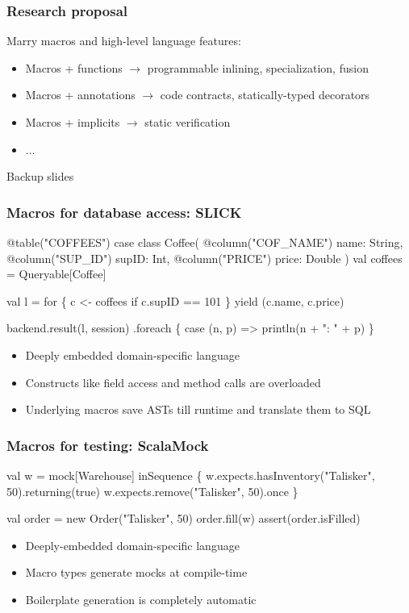 \documentclass[hyperref={bookmarks=false}]{beamer}
\begin{document}
\begin{frame}[fragile]
\frametitle{Research proposal}

Marry macros and high-level language features:

\begin{itemize}
\item Macros + functions $\rightarrow$ programmable inlining, specialization, fusion
\item Macros + annotations $\rightarrow$ code contracts, statically-typed decorators
\item Macros + implicits $\rightarrow$ static verification
\item ...
\end{itemize}
\end{frame}

\begin{frame}[fragile]
\vskip50pt
\begin{center}
\large Backup slides
\end{center}
\end{frame}

\begin{frame}[fragile]
\frametitle{Macros for database access: SLICK}
\begin{semiverbatim}
@table("COFFEES") case class Coffee(
  @column("COF_NAME") name: String,
  @column("SUP_ID") supID: Int,
  @column("PRICE") price: Double
)
val coffees = Queryable[Coffee]

val l = for \{ c <- coffees if c.supID == 101 \}
yield (c.name, c.price)

backend.result(l, session)
 .foreach \{ case (n, p) => println(n + ": " + p) \}
\end{semiverbatim}

\begin{itemize}
\item Deeply embedded domain-specific language
\item Constructs like field access and method calls are overloaded
\item Underlying macros save ASTs till runtime and translate them to SQL
\end{itemize}
\end{frame}

\begin{frame}[fragile]
\frametitle{Macros for testing: ScalaMock}
\begin{semiverbatim}
val w = mock[Warehouse]
inSequence \{
  w.expects.hasInventory("Talisker", 50).returning(true)
  w.expects.remove("Talisker", 50).once
\}

val order = new Order("Talisker", 50)
order.fill(w)
assert(order.isFilled)

\end{semiverbatim}

\begin{itemize}
\item Deeply-embedded domain-specific language
\item Macro types generate mocks at compile-time
\item Boilerplate generation is completely automatic
\end{itemize}
\end{frame}
\end{document}
